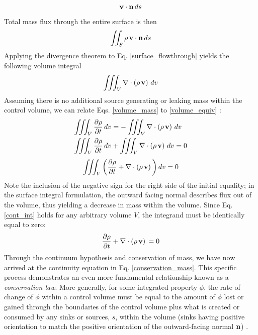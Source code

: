$$\vb{v}\cdot \vb{n} \, ds$$
Total mass flux through the entire surface is then
\begin{equation} \label{surface_flowthrough}
\iint_S \rho \, \vb{v}\cdot \vb{n} \, ds
\end{equation}
Applying the divergence theorem to Eq. \ref{surface_flowthrough} yields the following volume integral
\begin{equation} \label{volume_equiv}
\iiint_V \nabla \cdot \left(\rho \, \vb{v} \right) \, dv
\end{equation}
Assuming there is no additional source generating or leaking mass within the control volume, we can relate Eqs. \ref{volume_mass} to \ref{volume_equiv} : 
\begin{equation*}
\begin{aligned}
\iiint_{V} \dfrac{\partial \rho}{\partial t}\,dv &= - \iiint_V \nabla \cdot \left(\rho \, \vb{v} \right) \, dv \\ 
\iiint_{V} \dfrac{\partial \rho}{\partial t}\,dv &+ \iiint_V \nabla \cdot \left(\rho \, \vb{v} \right) \, dv  = 0 
\end{aligned}
\end{equation*}
\begin{equation} \label{cont_int}
\iiint_{V} \left( \dfrac{\partial \rho}{\partial t} + \nabla \cdot \left(\rho \, \vb{v} \right) \,\right) dv  = 0
\end{equation}
Note the inclusion of the negative sign for the right side of the initial equality; in the surface integral formulation, the outward facing normal describes flux out of the volume, thus yielding a decrease in mass within the volume. Since Eq. \ref{cont_int} holds for any arbitrary volume $V$, the integrand must be identically equal to zero:
\begin{equation} \label{conservation_mass}
\dfrac{\partial \rho}{\partial t} +  \nabla \cdot \left(\rho \, \vb{v} \right) \,  = 0
\end{equation}
Through the continuum hypothesis and conservation of mass, we have now arrived at the continuity equation in Eq. \ref{conservation_mass}. This specific process demonstrates an even more fundamental relationship known as a \textit{conservation law}. More generally, for some integrated property $\phi$, the rate of change of $\phi$ within a control volume must be equal to the amount of $\phi$ lost or gained through the boundaries of the control volume plus what is created or consumed by any sinks or sources, $s$, within the volume (sinks having positive orientation to match the positive orientation of the outward-facing normal $\vb{n}$) \cite{}. 
